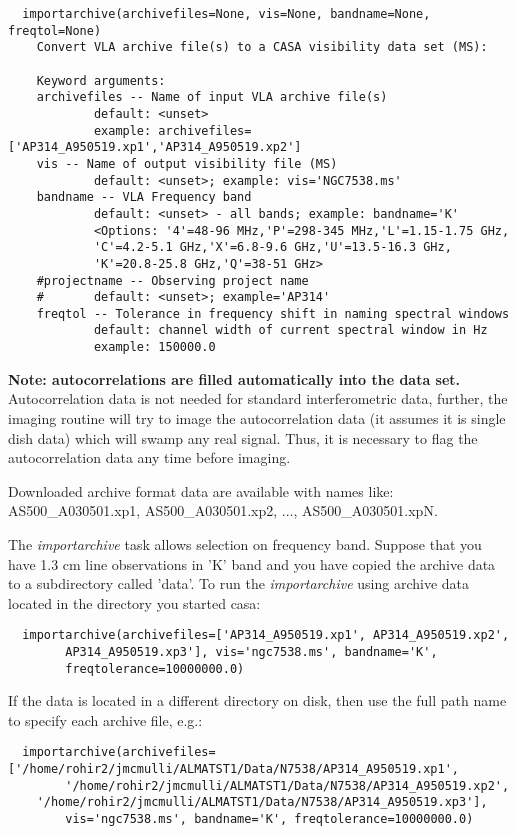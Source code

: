 \small
\begin{verbatim}
  importarchive(archivefiles=None, vis=None, bandname=None, freqtol=None)
    Convert VLA archive file(s) to a CASA visibility data set (MS):
    
    Keyword arguments:
    archivefiles -- Name of input VLA archive file(s)
            default: <unset>
            example: archivefiles=['AP314_A950519.xp1','AP314_A950519.xp2']
    vis -- Name of output visibility file (MS)
            default: <unset>; example: vis='NGC7538.ms'
    bandname -- VLA Frequency band
            default: <unset> - all bands; example: bandname='K'
            <Options: '4'=48-96 MHz,'P'=298-345 MHz,'L'=1.15-1.75 GHz,
            'C'=4.2-5.1 GHz,'X'=6.8-9.6 GHz,'U'=13.5-16.3 GHz,
            'K'=20.8-25.8 GHz,'Q'=38-51 GHz>
    #projectname -- Observing project name
    #       default: <unset>; example='AP314'
    freqtol -- Tolerance in frequency shift in naming spectral windows
            default: channel width of current spectral window in Hz
            example: 150000.0
\end{verbatim}
\normalsize

{\bf Note: autocorrelations are filled automatically into the data
set.}  Autocorrelation data is not needed for standard interferometric
data, further, the imaging routine will try to image the
autocorrelation data (it assumes it is single dish data) which will
swamp any real signal.  Thus, it is necessary to flag the
autocorrelation data any time before imaging.

Downloaded archive format data are available with names like:
AS500\_A030501.xp1, AS500\_A030501.xp2, ..., AS500\_A030501.xpN. 

The {\it importarchive} task allows selection on frequency band.
Suppose that you have 1.3 cm line observations in 'K' band and you
have copied the archive data to a subdirectory called 'data'.  To run
the {\it importarchive} using archive data located in the directory
you started casa:

\small
\begin{verbatim}
  importarchive(archivefiles=['AP314_A950519.xp1', AP314_A950519.xp2',
        AP314_A950519.xp3'], vis='ngc7538.ms', bandname='K', 
        freqtolerance=10000000.0)
\end{verbatim}
\normalsize

If the data is located in a different directory on disk, then use the
full path name to specify each archive file, e.g.:

\small
\begin{verbatim}
  importarchive(archivefiles=['/home/rohir2/jmcmulli/ALMATST1/Data/N7538/AP314_A950519.xp1',
        '/home/rohir2/jmcmulli/ALMATST1/Data/N7538/AP314_A950519.xp2',
	'/home/rohir2/jmcmulli/ALMATST1/Data/N7538/AP314_A950519.xp3'], 
        vis='ngc7538.ms', bandname='K', freqtolerance=10000000.0)
\end{verbatim}
\normalsize


